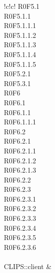 \begin{tabella}{!{\VRule}c!{\VRule}c!{\VRule}}
{					R0F5.1 \\
					R0F5.1.1 \\
					R0F5.1.1.1 \\
					R0F5.1.1.2 \\
					R0F5.1.1.3 \\
					R0F5.1.1.4 \\
					R0F5.1.1.5 \\
					R0F5.2.1 \\
					R0F5.3.1 \\
					R0F6 \\
					R0F6.1 \\
					R0F6.1.1 \\
					R0F6.1.1.1 \\
					R0F6.2 \\
					R0F6.2.1 \\
					R0F6.2.1.1 \\ 
					R0F6.2.1.2 \\
					R0F6.2.1.3 \\ 
					R0F6.2.2 \\
					R0F6.2.3 \\
					R0F6.2.3.1 \\
					R0F6.2.3.2 \\
					R0F6.2.3.3 \\
					R0F6.2.3.4 \\
					R0F6.2.3.5 \\ 
					R0F6.2.3.6 \\
				} \\
				
	CLIPS::client & \cellacaporiga{
		
}
\end{tabella}
